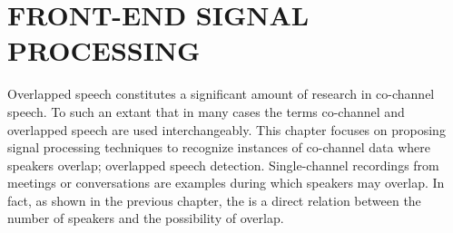 
\chapter{FRONT-END SIGNAL PROCESSING}

 
Overlapped speech constitutes a significant amount of research in co-channel speech. 
To such an extant that in many cases the terms co-channel and overlapped speech are used interchangeably. 
This chapter focuses on proposing signal processing techniques to recognize instances of co-channel data where speakers overlap; overlapped speech detection. 
Single-channel recordings from meetings or conversations are examples during which speakers may overlap. 
In fact, as shown in the previous chapter, the is a direct relation between the number of speakers and the possibility of overlap. 

